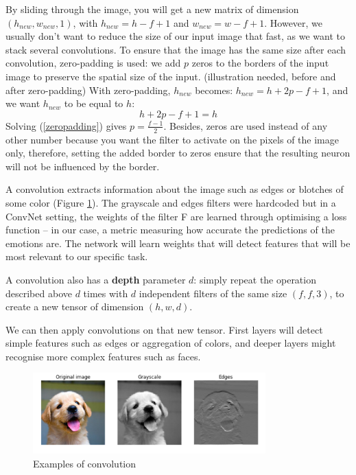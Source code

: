 By sliding through the image, you will get a new matrix of dimension $(h_{new}, w_{new},1)$, with $h_{new}=h-f+1$ and $w_{new}=w-f+1$. However, we usually don't want to reduce the size of our input image that fast, as we want to stack several convolutions. To ensure that the image has the same size after each convolution, zero-padding is used: we add $p$ zeros to the borders of the input image to preserve the spatial size of the input. (illustration needed, before and after zero-padding) With zero-padding, $h_{new}$ becomes: $h_{new} =  h + 2p - f + 1$, and we want $h_{new}$ to be equal to $h$:
\begin{equation}
    h + 2p - f + 1 = h
    \label{zeropadding}
\end{equation}
Solving (\ref{zeropadding}) gives $p=\frac{f-1}{2}$. Besides, zeros are used instead of any other number because you want the filter to activate on the pixels of the image only, therefore, setting the added border to zeros ensure that the resulting neuron will not be influenced by the border.

A convolution extracts information about the image such as edges or blotches of some color (Figure \ref{conv-ex}). The grayscale and edges filters were hardcoded but in a ConvNet setting, the weights of the filter F are learned through optimising a loss function -- in our case, a metric measuring how accurate the predictions of the emotions are. The network will learn weights that will detect features that will be most relevant to our specific task.

A convolution also has a \textbf{depth} parameter $d$: simply repeat the operation described above $d$ times with $d$ independent filters of the same size $(f, f, 3)$, to create a new tensor of dimension $(h,w,d)$.

We can then apply convolutions on that new tensor. First layers will detect simple features such as edges or aggregation of colors, and deeper layers might recognise more complex features such as faces.

\begin{figure}
\centering
\includegraphics[width=0.8\textwidth]{Images/conv_ex.png}
\caption{Examples of convolution}
\label{conv-ex}
\end{figure}

